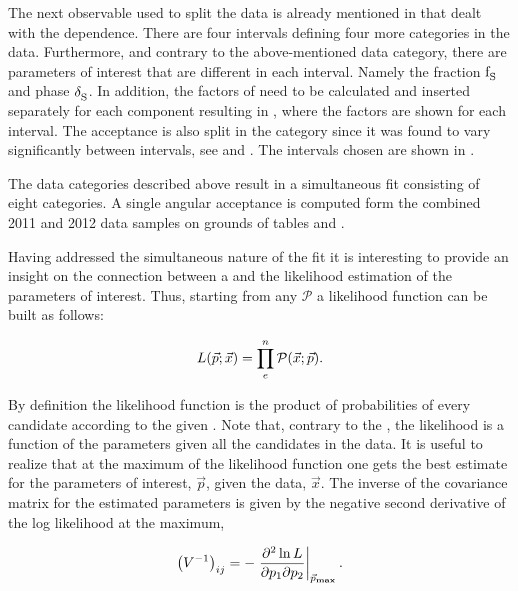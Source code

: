 The next observable used to split the data is already mentioned in  that dealt with the \mkpi dependence.
There are four \mkpi intervals defining four more categories in the data. Furthermore, and contrary to the above-mentioned data category, there
are parameters of interest that are different in each \mkpi interval. Namely the \swave fraction $\text{f}_{\text{S}}^{}$ and phase $\delta_{\text{S}}^{}$.
In addition, the \CSP factors of  need to be calculated and inserted separately for each component \pdf resulting in
, where the \CSP factors are shown for each \mkpi interval. The acceptance is also split in the \mkpi category
since it was found to vary significantly between \mkpi intervals, see  and .
The \mkpi intervals chosen are shown in .

The data categories described above result in a simultaneous fit consisting of eight categories.
A single angular acceptance is computed form the combined 2011 and 2012 data samples on grounds of
tables  and .

Having addressed the simultaneous nature of the fit it is interesting to provide an insight on
the connection between a \pdf and the likelihood estimation of the parameters of interest.
Thus, starting from any \pdf $\mathcal{P}$ a likelihood function can be built as follows:

\begin{equation}
  \centering
L(\vec{p};\vec{x}) = \prod_e^n \mathcal{P}(\vec{x};\vec{p}).
\label{likelihood}
\end{equation}

\noindent By definition the likelihood function is the product of probabilities of every candidate according to the
 given \pdf. Note that, contrary to the \pdf, the likelihood is a function of the parameters given all the candidates in the data.
It is useful to realize that at the maximum of the likelihood function one gets the best estimate for the parameters of
interest, $\vec{p}$, given the data, $\vec{x}$. The inverse of the covariance matrix for the estimated parameters is given
by the negative second derivative of the log likelihood at the maximum,

\begin{equation}
  \centering
\left( V^{-1} \right)_{ij} = - \left. \frac{\partial^2\ln L}{\partial p_1 \partial p_2} \right|_{ \vec{p}_{\rm\bf max}}.
\label{covariance}
\end{equation}

